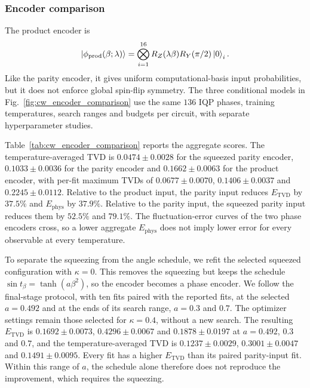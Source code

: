 \documentclass[pra,aps,10pt,twocolumn,floatfix,superscriptaddress, notitlepage,longbibliography]{revtex4-2}
\begin{document}


\subsubsection{Encoder comparison}
\label{sec:cw_product_ablation}

The product encoder is
\begin{equation}
 \ket{\phi_{\mathrm{prod}}(\beta;\lambda)}=
 \bigotimes_{i=1}^{16}R_Z(\lambda\beta)R_Y(\pi/2)\ket{0}_i .
 \label{eq:cw_product_input}
\end{equation}
Like the parity encoder, it gives uniform computational-basis input probabilities, but it does not enforce global spin-flip symmetry. The three conditional models in Fig.~\ref{fig:cw_encoder_comparison} use the same $136$ IQP phases, training temperatures, search ranges and budgets per circuit, with separate hyperparameter studies.

Table~\ref{tab:cw_encoder_comparison} reports the aggregate scores. The temperature-averaged TVD is $0.0474\pm0.0028$ for the squeezed parity encoder, $0.1033\pm0.0036$ for the parity encoder and $0.1662\pm0.0063$ for the product encoder, with per-fit maximum TVDs of $0.0677\pm0.0070$, $0.1406\pm0.0037$ and $0.2245\pm0.0112$. Relative to the product input, the parity input reduces $E_{\mathrm{TVD}}$ by $37.5\%$ and $E_{\mathrm{phys}}$ by $37.9\%$. Relative to the parity input, the squeezed parity input reduces them by $52.5\%$ and $79.1\%$. The fluctuation-error curves of the two phase encoders cross, so a lower aggregate $E_{\mathrm{phys}}$ does not imply lower error for every observable at every temperature.

To separate the squeezing from the angle schedule, we refit the selected squeezed configuration with $\kappa=0$. This removes the squeezing but keeps the schedule $\sin t_\beta=\tanh(a\beta^2)$, so the encoder becomes a phase encoder. We follow the final-stage protocol, with ten fits paired with the reported fits, at the selected $a=0.492$ and at the ends of its search range, $a=0.3$ and $0.7$. The optimizer settings remain those selected for $\kappa=0.4$, without a new search. The resulting $E_{\mathrm{TVD}}$ is $0.1692\pm0.0073$, $0.4296\pm0.0067$ and $0.1878\pm0.0197$ at $a=0.492$, $0.3$ and $0.7$, and the temperature-averaged TVD is $0.1237\pm0.0029$, $0.3001\pm0.0047$ and $0.1491\pm0.0095$. Every fit has a higher $E_{\mathrm{TVD}}$ than its paired parity-input fit. Within this range of $a$, the schedule alone therefore does not reproduce the improvement, which requires the squeezing.
\end{document}
